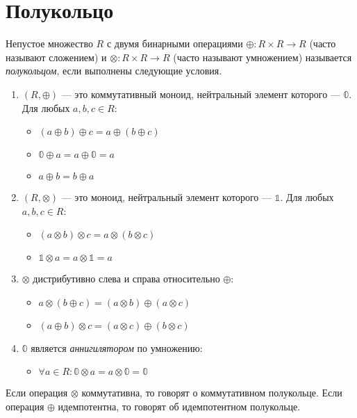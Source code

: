 \section{Полукольцо}

\begin{definition}

	Непустое множество $R$ с двумя бинарными операциями $\oplus\colon R \times R \to R$ (часто называют сложением) и $\otimes \colon R \times R \to R$ (часто называют умножением) называется \emph{полукольцом}, если выполнены следующие условия.
	\begin{enumerate}

		\item $(R, \oplus)$ --- это коммутативный моноид, нейтральный элемент которого --- $\mathbb{0}$. Для любых $a,b,c \in R$:
		      \begin{itemize}
			      \item $(a \oplus b) \oplus c = a \oplus (b \oplus c)$
			      \item $\mathbb{0} \oplus a = a \oplus \mathbb{0} = a$
			      \item $a \oplus b = b \oplus a$
		      \end{itemize}

		\item $(R, \otimes)$ --- это моноид, нейтральный элемент которого --- $\mathbb{1}$. Для любых $a,b,c \in R$:
		      \begin{itemize}
			      \item $(a \otimes b) \otimes c = a \otimes (b \otimes c)$
			      \item $\mathbb{1} \otimes a = a \otimes \mathbb{1} = a$
		      \end{itemize}

		\item $\otimes$ дистрибутивно слева и справа относительно $\oplus$:
		      \begin{itemize}
			      \item $a \otimes (b \oplus c) = (a \otimes b) \oplus (a \otimes c)$
			      \item $(a \oplus b) \otimes c = (a \otimes c) \oplus (b \otimes c)$
		      \end{itemize}


		\item $\mathbb{0}$ является \textit{аннигилятором} по умножению:
		      \begin{itemize}
			      \item $\forall a \in R: \mathbb{0} \otimes a = a \otimes \mathbb{0} = \mathbb{0}$
		      \end{itemize}

	\end{enumerate}

	Если операция $\otimes$ коммутативна, то говорят о коммутативном полукольце.
	Если операция $\oplus$ идемпотентна, то говорят об идемпотентном полукольце.

\end{definition}

